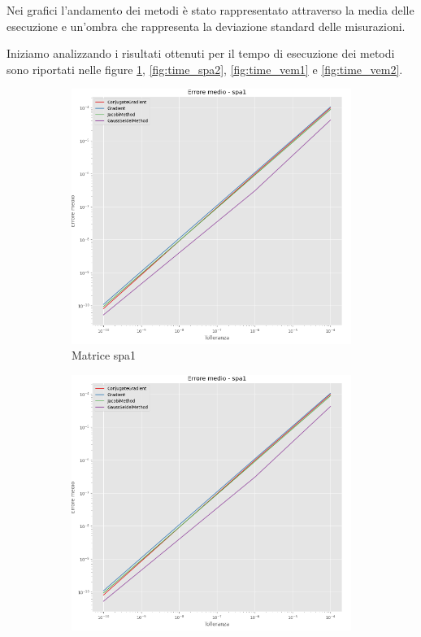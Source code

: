 Nei grafici l'andamento dei metodi è stato rappresentato attraverso la media delle
esecuzione e un'ombra che rappresenta la deviazione standard delle misurazioni.

Iniziamo analizzando i risultati ottenuti per il tempo di esecuzione dei metodi
sono riportati nelle figure \ref{fig:time_spa1}, \ref{fig:time_spa2}, \ref{fig:time_vem1}
e \ref{fig:time_vem2}.
\begin{figure}[!ht]
    \centering
    \begin{subfigure}{0.45\textwidth}
        \centering
        \includegraphics[width=\textwidth]{./img/error_spa1.png}
        \caption{Matrice spa1}
        \label{fig:time_spa1}
    \end{subfigure}
    \hfill
    \begin{subfigure}{0.45\textwidth}
        \centering
        \includegraphics[width=\textwidth]{./img/error_spa1.png}

\end{subfigure}
\end{figure}
